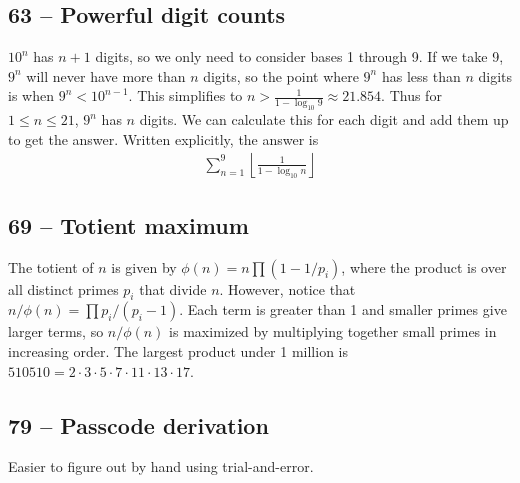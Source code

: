 \documentclass{article}
\begin{document}
\subsection*{63 -- Powerful digit counts}
$10^n$ has $n+1$ digits, so we only need to consider bases 1 through 9.
If we take 9, $9^n$ will never have more than $n$ digits, so the point where $9^n$ has less than $n$ digits is when $9^n < 10^{n-1}$.
This simplifies to $n > \frac{1}{1 - \log_{10}9} \approx 21.854$.
Thus for $1 \leq n \leq 21$, $9^n$ has $n$ digits.
We can calculate this for each digit and add them up to get the answer. Written explicitly, the answer is
\begin{align*}
	\boxed{ \sum\limits_{n=1}^9 \left\lfloor \frac{1}{1 - \log_{10} n} \right\rfloor }
\end{align*}


\subsection*{69 -- Totient maximum}
The totient of $n$ is given by $\phi(n) =n \prod (1-1/p_i)$, where the product is over all distinct primes $p_i$ that divide $n$.
However, notice that $n/\phi(n) = \prod p_i/(p_i -1)$.
Each term is greater than 1 and smaller primes give larger terms, so $n/\phi(n)$ is maximized by multiplying together small primes in increasing order. The largest product under 1 million is $\boxed{510510} = 2 \cdot 3\cdot5\cdot7\cdot11\cdot13\cdot17$.


\subsection*{79 -- Passcode derivation}
Easier to figure out by hand using trial-and-error.
\end{document}
